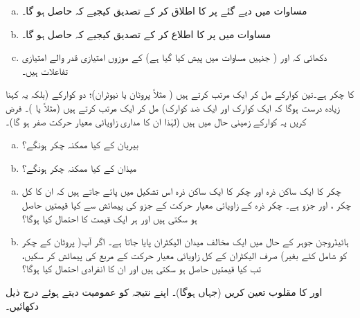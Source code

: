 \begin{enumerate}[a.]
\item
مساوات  میں دیے گئے  پر  کا اطلاق کر کے تصدیق کیجیے
 کہ  حاصل ہو گا۔
\item
مساوات  میں  پر  کا اطلاع کر کے تصدیق کیجیے کہ  حاصل ہو گا۔
\item
دکھائی کہ  اور  ( جنہیں مساوات  میں پیش کیا گیا ہے)  کے موزوں امتیازی قدر والے امتیازی تفاعلات ہیں۔ 
\end{enumerate}
 کا چکر  ہے۔تین کوارکے مل کر ایک  مرتب کرتے ہیں ( مثلاً پروٹان یا نیوٹران)؛ دو کوارکے (بلکہ یہ کہنا زیادہ درست ہوگا کہ ایک کوارک اور ایک ضد کوارک) مل کر ایک  مرتب کرتے ہیں (مثلاً  یا )۔ فرض کریں یہ کوارکے زمینی حال میں ہیں (لہٰذا ان کا مداری زاویائی معیار حرکت صفر ہو گا)۔ 
\begin{enumerate}[a.]
\item
بیریان کے کیا ممکنہ چکر ہونگے؟ 
\item
میذان کے کیا ممکنہ چکر ہونگے؟ 
\end{enumerate}
\begin{enumerate}[a.]
\item
چکر  کا ایک ساکن ذرہ اور چکر  کا ایک ساکن ذرہ اس تشکیل میں پائے جاتے ہیں کہ ان کا کل چکر ، اور  جزو  ہے۔ چکر  ذرہ کے زاویائی معیار حرکت کے  جزو کی پیمائش سے کیا قیمتیں حاصل ہو سکتی ہیں اور ہر ایک قیمت کا احتمال کیا ہوگا؟ 
\item
ہائیڈروجن جوہر کے حال  میں ایک مخالف میدان الیکٹران پایا جاتا ہے۔ اگر آپ( پروٹان کے چکر کو شامل کئے بغیر) صرف الیکٹران کے کل زاویائی معیار حرکت کے مربع کی پیمائش کر سکیں، تب کیا قیمتیں حاصل ہو سکتی ہیں اور ان کا انفرادی احتمال کیا ہوگا؟ 
\end{enumerate}
 اور  کا مقلوب تعین کریں (جہاں  ہوگا)۔ اپنے نتیجہ کو عمومیت دیتے ہوئے درج ذیل دکھائیں۔ 
